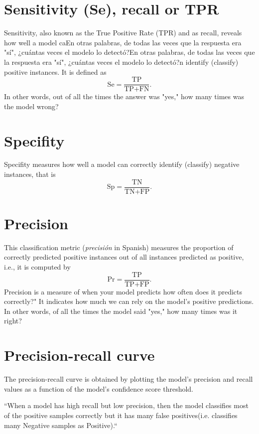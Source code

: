 \section{Sensitivity (Se), recall or TPR}
Sensitivity, also known as the True Positive Rate (TPR) and as recall,
reveals how well a model caEn otras palabras, de todas las veces que la respuesta era "sí", ¿cuántas veces el modelo lo detectó?En otras palabras, de todas las veces que la respuesta era "sí", ¿cuántas veces el modelo lo detectó?n identify (classify) positive
instances. It is defined as
\begin{equation}
  \text{Se} = \frac{\text{TP}}{\text{TP} + \text{FN}}.
\end{equation}
In other words, out of all the times the answer was "yes," how many times was the model wrong?

\section{Specifity}
Specifity measures how well a model can correctly identify (classify)
negative instances, that is
\begin{equation}
  \text{Sp} = \frac{\text{TN}}{\text{TN} + \text{FP}}.
\end{equation}

\section{Precision}
This classification metric (\emph{precisión} in Spanish) measures the proportion of correctly predicted positive instances out of all instances predicted as positive, i.e., it is computed by
\begin{equation}
  \text{Pr} = \frac{\text{TP}}{\text{TP} + \text{FP}}.
\end{equation}
Precision is a measure of when your model predicts how often does it
predicts correctly?" It indicates how much we can rely on the model's
positive predictions.  In other words, of all the times the model said
"yes," how many times was it right?

\section{Precision-recall curve}
The precision-recall curve is obtained by plotting the model's
precision and recall values as a function of the model's confidence
score threshold.

“When a model has high recall but low precision, then the model
classifies most of the positive samples correctly but it has many
false positives(i.e. classifies many Negative samples as Positive).“

